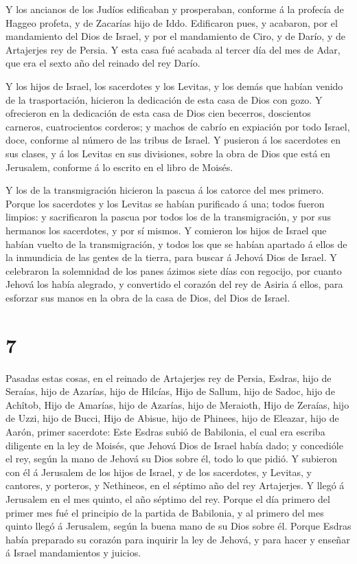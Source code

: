  Y los ancianos de los Judíos edificaban y prosperaban,
conforme á la profecía de Haggeo profeta, y de Zacarías hijo de Iddo.
Edificaron pues, y acabaron, por el mandamiento del Dios de Israel, y
por el mandamiento de Ciro, y de Darío, y de Artajerjes rey de Persia.
 Y esta casa fué acabada al tercer día del mes de Adar, que
era el sexto año del reinado del rey Darío.

 Y los hijos de Israel, los sacerdotes y los Levitas, y los
demás que habían venido de la trasportación, hicieron la dedicación de
esta casa de Dios con gozo.  Y ofrecieron en la dedicación
de esta casa de Dios cien becerros, doscientos carneros, cuatrocientos
corderos; y machos de cabrío en expiación por todo Israel, doce,
conforme al número de las tribus de Israel.  Y pusieron á
los sacerdotes en sus clases, y á los Levitas en sus divisiones, sobre
la obra de Dios que está en Jerusalem, conforme á lo escrito en el libro
de Moisés.

 Y los de la transmigración hicieron la pascua á los
catorce del mes primero.  Porque los sacerdotes y los
Levitas se habían purificado á una; todos fueron limpios: y sacrificaron
la pascua por todos los de la transmigración, y por sus hermanos los
sacerdotes, y por sí mismos.  Y comieron los hijos de
Israel que habían vuelto de la transmigración, y todos los que se habían
apartado á ellos de la inmundicia de las gentes de la tierra, para
buscar á Jehová Dios de Israel.  Y celebraron la solemnidad
de los panes ázimos siete días con regocijo, por cuanto Jehová los había
alegrado, y convertido el corazón del rey de Asiria á ellos, para
esforzar sus manos en la obra de la casa de Dios, del Dios de Israel.

\hypertarget{section-6}{%
\section{7}\label{section-6}}

 Pasadas estas cosas, en el reinado de Artajerjes rey de
Persia, Esdras, hijo de Seraías, hijo de Azarías, hijo de Hilcías,
 Hijo de Sallum, hijo de Sadoc, hijo de Achîtob,
 Hijo de Amarías, hijo de Azarías, hijo de Meraioth,
 Hijo de Zeraías, hijo de Uzzi, hijo de Bucci, 
Hijo de Abisue, hijo de Phinees, hijo de Eleazar, hijo de Aarón, primer
sacerdote:  Este Esdras subió de Babilonia, el cual era
escriba diligente en la ley de Moisés, que Jehová Dios de Israel había
dado; y concedióle el rey, según la mano de Jehová su Dios sobre él,
todo lo que pidió.  Y subieron con él á Jerusalem de los
hijos de Israel, y de los sacerdotes, y Levitas, y cantores, y porteros,
y Nethineos, en el séptimo año del rey Artajerjes.  Y llegó
á Jerusalem en el mes quinto, el año séptimo del rey. 
Porque el día primero del primer mes fué el principio de la partida de
Babilonia, y al primero del mes quinto llegó á Jerusalem, según la buena
mano de su Dios sobre él.  Porque Esdras había preparado su
corazón para inquirir la ley de Jehová, y para hacer y enseñar á Israel
mandamientos y juicios.

